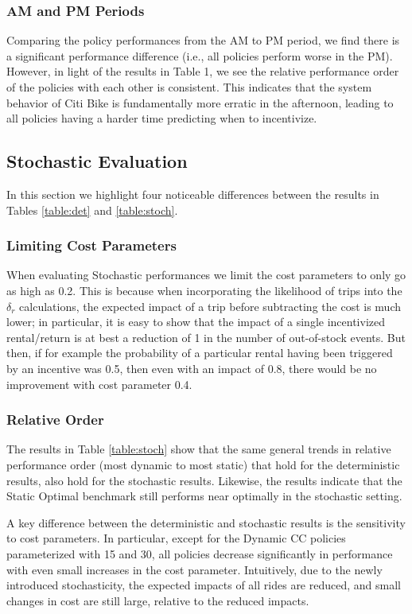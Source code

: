 \subsubsection{AM and PM Periods}
Comparing the policy performances from the AM to PM period, we find there is a significant performance difference (i.e., all policies perform worse in the PM). However, in light of the results in Table 1, we see the relative performance order of the policies with each other is consistent. This indicates that the system behavior of Citi Bike is fundamentally more erratic in the afternoon, leading to all policies having a harder time predicting when to incentivize.

\subsection{Stochastic Evaluation}

In this section we highlight four noticeable differences between the results in Tables \ref{table:det} and \ref{table:stoch}.

\subsubsection{Limiting Cost Parameters}
When evaluating Stochastic performances we limit the cost parameters to only go as high as 0.2. This is because when incorporating the likelihood of trips into the $\delta_r$ calculations, the expected impact of a trip before subtracting the cost is much lower; in particular, it is easy to show that the impact of a single incentivized rental/return is at best a reduction of 1 in the number of out-of-stock events. But then, if for example the probability of a particular rental having been triggered by an incentive was 0.5, then even with an impact of 0.8, there would be no improvement with cost parameter 0.4.

\subsubsection{Relative Order}

The results in Table \ref{table:stoch} show that the same general trends  in relative performance order (most dynamic to most static) that hold for the deterministic results, also hold for the stochastic results. Likewise, the results indicate that the Static Optimal benchmark still performs near optimally in the stochastic setting.

A key difference between the deterministic and stochastic results is the sensitivity to cost parameters. In particular, except for the Dynamic CC policies parameterized with 15 and 30, all policies decrease significantly in performance with even small increases in the cost parameter. Intuitively, due to the newly introduced stochasticity, the expected impacts of all rides are reduced, and small changes in cost are still large, relative to the reduced impacts. 

